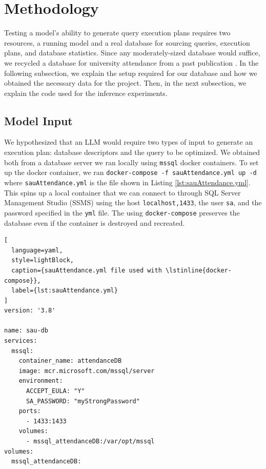 \section{Methodology}
Testing a model's ability to generate query execution plans requires two resources, a running model and a real database for sourcing queries, execution plans, and database statistics. Since any moderately-sized database would suffice, we recycled a database for university attendance from a past publication \cite{hybl2023}. In the following subsection, we explain the setup required for our database and how we obtained the necessary data for the project. Then, in the next subsection, we explain the code used for the inference experiments.

\subsection{Model Input}
We hypothesized that an LLM would require two types of input to generate an execution plan: database descriptors and the query to be optimized. We obtained both from a database server we ran locally using \lstinline{mssql} docker containers. To set up the docker container, we ran \lstinline{docker-compose -f sauAttendance.yml up -d} where \lstinline{sauAttendance.yml} is the file shown in Listing \ref{lst:sauAttendance.yml}. This spins up a local container that we can connect to through SQL Server Management Studio (SSMS) using the host \lstinline{localhost,1433}, the user \lstinline{sa}, and the password specified in the \lstinline{yml} file. The using \lstinline{docker-compose} preserves the database even if the container is destroyed and recreated.

\begin{lstlisting}[
  language=yaml,
  style=lightBlock,
  caption={sauAttendance.yml file used with \lstinline{docker-compose}},
  label={lst:sauAttendance.yml}
]
version: '3.8'

name: sau-db
services:
  mssql:
    container_name: attendanceDB
    image: mcr.microsoft.com/mssql/server
    environment:
      ACCEPT_EULA: "Y"
      SA_PASSWORD: "myStrongPassword"
    ports:
      - 1433:1433
    volumes:
      - mssql_attendanceDB:/var/opt/mssql
volumes:
  mssql_attendanceDB:
\end{lstlisting}

